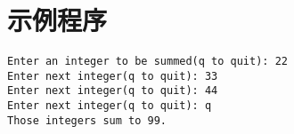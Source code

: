 \section{示例程序}

\begin{frame}\ft{\secname}

\end{frame}



\begin{frame}[fragile]\ft{\secname}
\begin{lstlisting}[backgroundcolor=\color{red!10}]
Enter an integer to be summed(q to quit): 22
Enter next integer(q to quit): 33
Enter next integer(q to quit): 44
Enter next integer(q to quit): q
Those integers sum to 99.
\end{lstlisting}
\end{frame}
